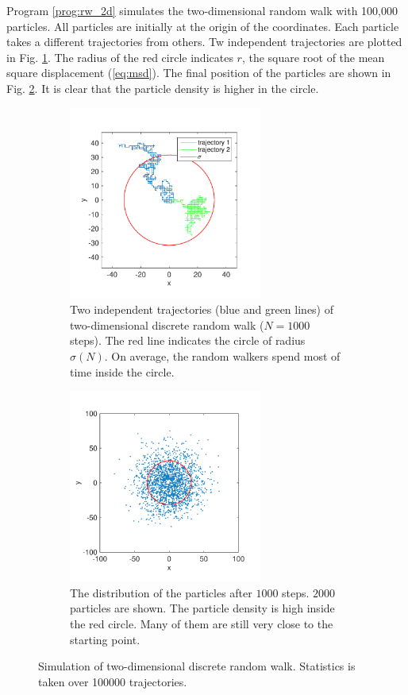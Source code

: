 \bigskip
\begin{example}\label{ex:2d-rw}

Program \ref{prog:rw_2d} simulates the two-dimensional random walk with 100,000 particles.
All particles are initially at the origin of the coordinates. Each particle takes a different trajectories from others. Tw independent trajectories are plotted in Fig. \ref{fig:rw_2d_trajectory}.  The radius of the red circle indicates $r$, the square root of the mean square displacement (\ref{eq:msd}).  The final position of the particles are shown in Fig. \ref{fig:rw_2d_distribution}. It is clear that the particle density is higher in the circle.

\begin{figure}
	\centering
	\begin{subfigure}{0.45\textwidth}
		\centering
		\includegraphics[width=2.5in]{16.Random-Walk/rw_2d_trajectory.pdf}
		\caption{Two independent trajectories (blue and green lines) of two-dimensional discrete random walk ($N=1000$ steps).  The red line indicates the circle of radius $\sigma(N)$.  On average, the random walkers spend most of time inside the circle.}
		\label{fig:rw_2d_trajectory}
	\end{subfigure}
	\begin{subfigure}{0.45\textwidth}
		\centering
		\includegraphics[width=2.5in]{16.Random-Walk/rw_2d_distribution.pdf}
		\caption{The distribution of the particles after $1000$ steps.  $2000$ particles are shown.  The particle density is high inside the red circle.   Many of them are still very close to the starting point.}
		\label{fig:rw_2d_distribution}
	\end{subfigure}
	\caption{Simulation of two-dimensional discrete random walk. Statistics is taken over 100000 trajectories.}\label{fig:rw_2d}
\end{figure}

\end{example}

